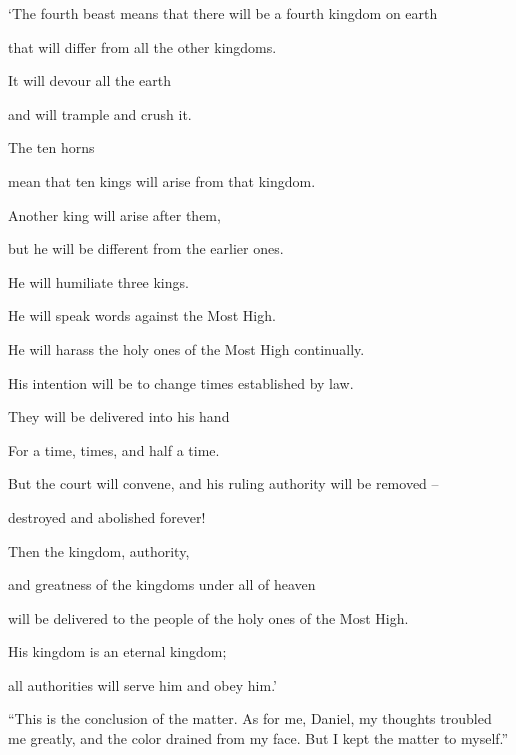 {\par }{\Q ‘The fourth
beast
means that there will be
a fourth
kingdom
on earth
\par }{\Q that
will differ
from
all
the other kingdoms.
\par }{\Q It will devour
all
the earth
\par }{\Q and will trample
and crush it.
\par }{\Q {}The ten
horns
\par }{\Q mean that ten
kings
will arise
from
that kingdom.
\par }{\Q Another
king will arise
after
them,
\par }{\Q but he will
be different
from
the earlier
ones.
\par }{\Q He will humiliate
three
kings.
\par }{\Q {}He will speak
words
against
the Most High.
\par }{\Q He will harass
the holy ones
of the Most High
continually.
\par }{\Q His intention
will be to change
times
established by law.
\par }{\Q They will be delivered
into his hand
\par }{\Q For
a time,
times,
and half
a time.
\par }{\Q {}But the court
will convene,
and his ruling authority
will be removed
–
\par }{\Q destroyed
and abolished
forever!
\par }{\Q {}Then
the kingdom,
authority,
\par }{\Q and greatness
of the kingdoms
under
all
of heaven
\par }{\Q will be delivered
to the people
of the holy ones
of the Most High.
\par }{\Q His kingdom
is an eternal
kingdom;
\par }{\Q all
authorities
will serve
him and obey him.’
\par }{\PP {}“This
is the conclusion
of the matter.
As for me,
Daniel,
my thoughts
troubled
me greatly,
and the color drained
from my face.
But I
kept
the matter
to myself.”

}
